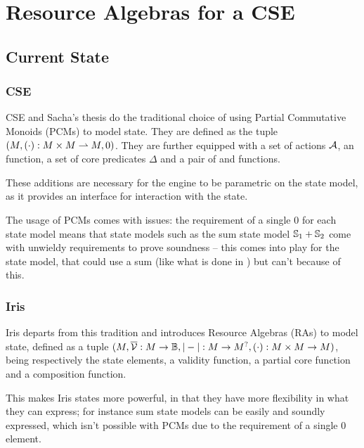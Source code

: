 \chapter{Resource Algebras for a CSE}

\section{Current State}

\subsection{CSE}

CSE and Sacha's thesis do the traditional choice of using Partial Commutative Monoids (PCMs) to model state. They are defined as the tuple $(M, (\cdot):M\times M \rightharpoonup M, 0)$. They are further equipped with a set of actions $\cal A$, an \execac{} function, a set of core predicates $\Delta$ and a pair of \consume{} and \produce{} functions.

These additions are necessary for the engine to be parametric on the state model, as it provides an interface for interaction with the state.

The usage of PCMs comes with issues: the requirement of a single 0 for each state model means that state models such as the sum state model $\mathbb S_1 + \mathbb S_2$ come with unwieldy requirements to prove soundness -- this comes into play for the  state model, that could use a sum (like what is done in \cite{iris-thesis}) but can't because of this.

\subsection{Iris}

Iris \cite{iris} departs from this tradition and introduces Resource Algebras (RAs) to model state, defined as a tuple $(M, \overline{\cal V}: M\rightarrow \mathbb{B}, |-|:M\rightarrow M^?, (\cdot):M\times M\rightarrow M)$, being respectively the state elements, a validity function, a partial core function and a composition function.

This makes Iris states more powerful, in that they have more flexibility in what they can express; for instance sum state models can be easily and soundly expressed, which isn't possible with PCMs due to the requirement of a single $0$ element.

